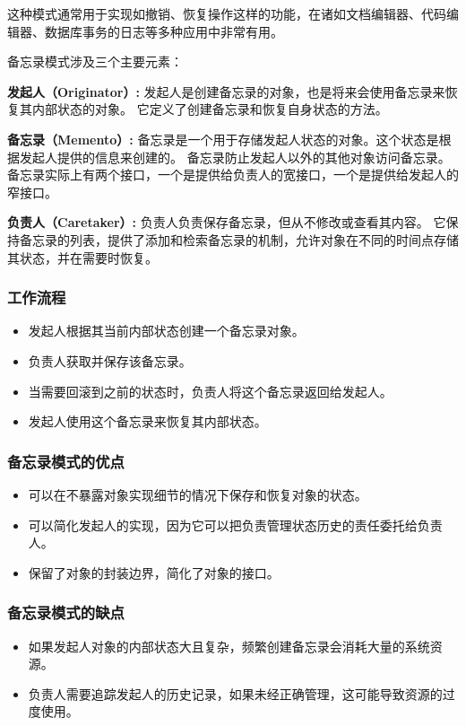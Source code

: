 这种模式通常用于实现如撤销、恢复操作这样的功能，在诸如文档编辑器、代码编辑器、数据库事务的日志等多种应用中非常有用。

备忘录模式涉及三个主要元素：

\textbf{发起人（Originator）:}
发起人是创建备忘录的对象，也是将来会使用备忘录来恢复其内部状态的对象。
它定义了创建备忘录和恢复自身状态的方法。

\textbf{备忘录（Memento）:}
备忘录是一个用于存储发起人状态的对象。这个状态是根据发起人提供的信息来创建的。
备忘录防止发起人以外的其他对象访问备忘录。备忘录实际上有两个接口，一个是提供给负责人的宽接口，一个是提供给发起人的窄接口。

\textbf{负责人（Caretaker）:}
负责人负责保存备忘录，但从不修改或查看其内容。
它保持备忘录的列表，提供了添加和检索备忘录的机制，允许对象在不同的时间点存储其状态，并在需要时恢复。

\subsubsection{工作流程}
\begin{itemize}
	\item 发起人根据其当前内部状态创建一个备忘录对象。
	\item 负责人获取并保存该备忘录。
	\item 当需要回滚到之前的状态时，负责人将这个备忘录返回给发起人。
	\item 发起人使用这个备忘录来恢复其内部状态。
\end{itemize}

\subsubsection{备忘录模式的优点}
\begin{itemize}
	\item 可以在不暴露对象实现细节的情况下保存和恢复对象的状态。
	\item 可以简化发起人的实现，因为它可以把负责管理状态历史的责任委托给负责人。
	\item 保留了对象的封装边界，简化了对象的接口。
\end{itemize}

\subsubsection{备忘录模式的缺点}
\begin{itemize}
	\item 如果发起人对象的内部状态大且复杂，频繁创建备忘录会消耗大量的系统资源。
	\item 负责人需要追踪发起人的历史记录，如果未经正确管理，这可能导致资源的过度使用。
\end{itemize}

